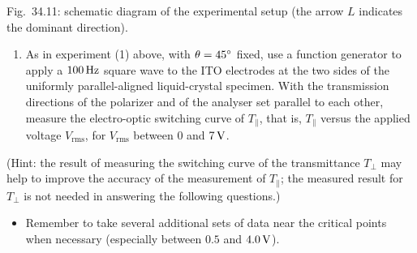Fig.~34.11: schematic diagram of the experimental setup (the arrow $L$ indicates the dominant
direction).

\begin{center}
\end{center}

\begin{enumerate}
\item[(3)] As in experiment (1) above, with $\theta=45^{\circ}$ fixed, use a function generator
to apply a $100\,\mathrm{Hz}$ square wave to the ITO electrodes at the two sides of the uniformly
parallel-aligned liquid-crystal specimen. With the transmission directions of the polarizer and
of the analyser set parallel to each other, measure the electro-optic switching curve of
$T_{\parallel}$, that is, $T_{\parallel}$ versus the applied voltage $V_{\mathrm{rms}}$, for
$V_{\mathrm{rms}}$ between $0$ and $7\,\mathrm{V}$.
\end{enumerate}

(Hint: the result of measuring the switching curve of the transmittance $T_{\perp}$ may help to
improve the accuracy of the measurement of $T_{\parallel}$; the measured result for
$T_{\perp}$ is not needed in answering the following questions.)

\begin{itemize}
\item Remember to take several additional sets of data near the critical points when necessary
(especially between $0.5$ and $4.0\,\mathrm{V}$).
\end{itemize}

\begin{center}
\end{center}

\begin{center}
\end{center}

